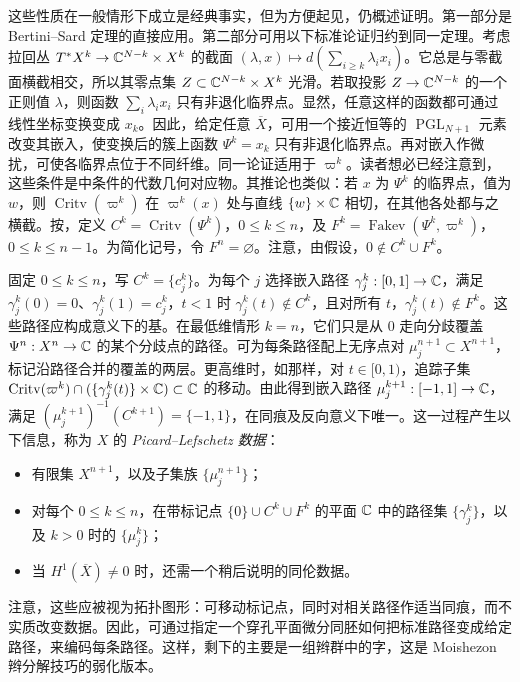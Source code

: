 这些性质在一般情形下成立是经典事实，但为方便起见，仍概述证明。第一部分是 Bertini--Sard 定理的直接应用。第二部分可用以下标准论证归约到同一定理。考虑拉回丛 $T^*X^k\to\mathbb C^{N-k}\times X^k$ 的截面 $(\lambda,x)\mapsto d(\sum_{i\ge k}\lambda_i x_i)$。它总是与零截面横截相交，所以其零点集 $Z\subset\mathbb C^{N-k}\times X^k$ 光滑。若取投影 $Z\to\mathbb C^{N-k}$ 的一个正则值 $\lambda$，则函数 $\sum_i\lambda_i x_i$ 只有非退化临界点。显然，任意这样的函数都可通过线性坐标变换变成 $x_k$。因此，给定任意 $\overline X$，可用一个接近恒等的 $\operatorname{PGL}_{N+1}$ 元素改变其嵌入，使变换后的簇上函数 $\Psi^k=x_k$ 只有非退化临界点。再对嵌入作微扰，可使各临界点位于不同纤维。同一论证适用于 $\varpi^k$。读者想必已经注意到，这些条件是中条件的代数几何对应物。其推论也类似：若 $x$ 为 $\Psi^k$ 的临界点，值为 $w$，则 $\operatorname{Critv}(\varpi^k)$ 在 $\varpi^k(x)$ 处与直线 $\{w\}\times\mathbb C$ 相切，在其他各处都与之横截。按，定义 $C^k=\operatorname{Critv}(\Psi^k)$，$0\le k\le n$，及 $F^k=\operatorname{Fakev}(\Psi^k,\varpi^k)$，$0\le k\le n-1$。为简化记号，令 $F^n=\varnothing$。注意，由假设，$0\notin C^k\cup F^k$。

固定 $0\le k\le n$，写 $C^k=\{c_j^k\}$。为每个 $j$ 选择嵌入路径 $\gamma_j^k:[0,1]\to\mathbb C$，满足 $\gamma_j^k(0)=0$、$\gamma_j^k(1)=c_j^k$，$t<1$ 时 $\gamma_j^k(t)\notin C^k$，且对所有 $t$，$\gamma_j^k(t)\notin F^k$。这些路径应构成意义下的基。在最低维情形 $k=n$，它们只是从 $0$ 走向分歧覆盖 $\Psi^n:X^n\to\mathbb C$ 的某个分歧点的路径。可为每条路径配上无序点对 $\mu_j^{n+1}\subset X^{n+1}$，标记沿路径合并的覆盖的两层。更高维时，如那样，对 $t\in[0,1)$，追踪子集 $\operatorname{Critv}(\varpi^k)\cap(\{\gamma_j^k(t)\}\times\mathbb C)\subset\mathbb C$ 的移动。由此得到嵌入路径 $\mu_j^{k+1}:[-1,1]\to\mathbb C$，满足 $(\mu_j^{k+1})^{-1}(C^{k+1})=\{-1,1\}$，在同痕及反向意义下唯一。这一过程产生以下信息，称为 $X$ 的 \emph{Picard--Lefschetz 数据}：
\begin{itemize}
\item 有限集 $X^{n+1}$，以及子集族 $\{\mu_j^{n+1}\}$；
\item 对每个 $0\le k\le n$，在带标记点 $\{0\}\cup C^k\cup F^k$ 的平面 $\mathbb C$ 中的路径集 $\{\gamma_j^k\}$，以及 $k>0$ 时的 $\{\mu_j^k\}$；
\item 当 $H^1(\overline X)\ne0$ 时，还需一个稍后说明的同伦数据。
\end{itemize}
注意，这些应被视为拓扑图形：可移动标记点，同时对相关路径作适当同痕，而不实质改变数据。因此，可通过指定一个穿孔平面微分同胚如何把标准路径变成给定路径，来编码每条路径。这样，剩下的主要是一组辫群中的字，这是 Moishezon 辫分解技巧的弱化版本。

